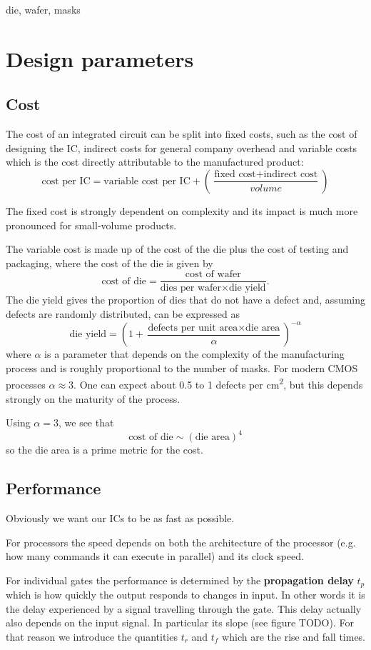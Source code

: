 \documentclass{report}
\begin{document}
die, wafer, masks
\section{Design parameters}
\subsection{Cost}
The cost of an integrated circuit can be split into fixed costs, such as the cost of designing the IC, indirect costs for general company overhead and variable costs which is the cost directly attributable to the manufactured product:
\[ \text{cost per IC} = \text{variable cost per IC} + \left(\frac{\text{fixed cost}+\text{indirect cost}}{volume}\right)\]

The fixed cost is strongly dependent on complexity and its impact is much more pronounced for small-volume products.

The variable cost is made up of the cost of the die plus the cost of testing and packaging, where the cost of the die is given by
\[ \text{cost of die} = \frac{\text{cost of wafer}}{\text{dies per wafer}\times \text{die yield}}. \]
The die yield gives the proportion of dies that do not have a defect and, assuming defects are randomly distributed, can be expressed as
\[ \text{die yield} = \left(1+ \frac{\text{defects per unit area}\times \text{die area}}{\alpha}\right)^{-\alpha} \]
where $\alpha$ is a parameter that depends on the complexity of the manufacturing process and is roughly proportional to the number of masks. For modern CMOS processes $\alpha \approx 3$. One can expect about 0.5 to 1 defects per \si{cm^2}, but this depends strongly on the maturity of the process.

Using $\alpha = 3$, we see that
\[ \text{cost of die} \sim (\text{die area})^4 \]
so the die area is a prime metric for the cost.

\subsection{Performance}
Obviously we want our ICs to be as fast as possible.

For processors the speed depends on both the architecture of the processor (e.g. how many commands it can execute in parallel) and its clock speed.

For individual gates the performance is determined by the \textbf{propagation delay} $t_p$ which is how quickly the output responds to changes in input. In other words it is the delay experienced by a signal travelling through the gate. This delay actually also depends on the input signal. In particular its slope (see figure TODO). For that reason we introduce the quantities $t_r$ and $t_f$ which are the rise and fall times.
\end{document}
